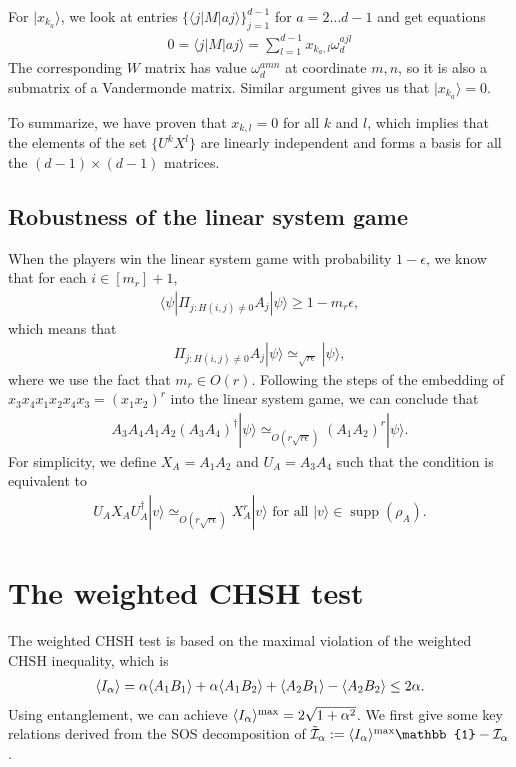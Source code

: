 \documentclass[11pt,letterpaper]{article}
\newcommand{\ket}[1]{|#1\rangle}
\newcommand{\bra}[1]{\langle#1|}
\DeclarePairedDelimiter{\ip}{\langle}{\rangle}
\DeclareMathOperator{\supp}{supp}
\newcommand{\1}{\mathbb{1}}
\newcommand{\I}{\mathcal{I}}
\newcommand{\appd}[1]{\simeq_{#1}}
\theoremstyle{definition}
\begin{document}
For $\ket{x_{k_a}}$, we look at entries $\{\bra{j}M\ket{aj}\}_{j=1}^{d-1}$ for $a = 2 \dots d-1$ and get equations
\begin{align}
	0 = \bra{j}M\ket{aj} = \sum_{l=1}^{d-1} x_{k_a, l} \omega_d^{ajl} 
\end{align}
The corresponding $W$ matrix has value $\omega_d^{amn}$ at coordinate $m,n$,
so it is also a submatrix of a Vandermonde matrix. Similar argument gives us that $\ket{x_{k_a}} = 0$.

To summarize, we have proven that $x_{k,l} = 0$ for all $k$ and $l$, which implies that the elements of the set
$\{ U^k X^l \}$ are linearly independent and forms a basis for all the $(d-1)\times(d-1)$ matrices.
\subsection{Robustness of the linear system game}
When the players win the linear system game with probability $1-\epsilon$,
we know that for each $i \in [m_r]+1$,
\begin{align}
\bra{\psi} \Pi_{j:H(i,j) \neq 0} A_j \ket{\psi} \geq 1- m_r \epsilon,
\end{align}
which means that 
\begin{align}
	\Pi_{j:H(i,j) \neq 0} A_j \ket{\psi} \appd{\sqrt{r\epsilon}} \ket{\psi},
\end{align}
where we use the fact that $m_r \in O(r)$.
Following the steps of the embedding of $x_3x_4x_1x_2x_4x_3 = (x_1x_2)^r$ into the linear system game,
we can conclude that 
\begin{align}
	A_3A_4 A_1A_2 (A_3A_4)^\dagger \ket{\psi}\appd{O(r\sqrt{r\epsilon})} (A_1A_2)^r \ket{\psi}.
\end{align}
For simplicity, we define $X_A = A_1A_2$ and $U_A=A_3A_4$ such that
the condition is equivalent to
\begin{align}
	\label{eq:ux_relation}
	U_AX_AU_A^\dagger \ket{v} \appd{O(r\sqrt{r\epsilon})} X_A^r \ket{v} \text{ for all } \ket{v} \in \supp(\rho_A).
\end{align}
\section{The weighted CHSH test}
\label{sec:weightedchsh}
The weighted CHSH test is based on the maximal violation of the weighted CHSH inequality,
which is
\begin{align}
	\ip{I_\alpha} = \alpha \ip{A_1B_1}+\alpha\ip{A_1B_2} + \ip{A_2B_1} - \ip{A_2B_2}\leq 2\alpha.
\end{align}
Using entanglement, we can achieve $\ip{I_\alpha}^{\max} = 2\sqrt{1+\alpha^2}$.
We first give some key relations derived from the SOS decomposition of $\tilde{\I}_\alpha := \ip{I_\alpha}^{\max}\1 - \I_\alpha$.
\end{document}
